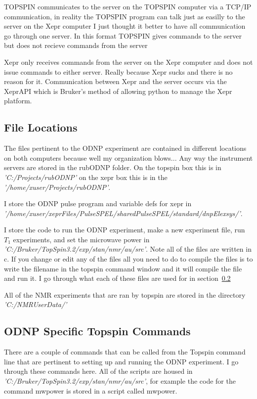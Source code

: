 \documentclass{article}
\newcommand{\fc}[1]{{\color{blue}\textit{'{#1}'}}}
\begin{document}
TOPSPIN communicates to the server on the TOPSPIN computer via a TCP/IP communication, in reality the TOPSPIN program can talk just as easilly to the server on the Xepr computer I just thought it better to have all communication go through one server. In this format TOPSPIN gives commands to the server but does not recieve commands from the server

Xepr only receives commands from the server on the Xepr computer and does not issue commands to either server. Really because Xepr sucks and there is no reason for it. Communication between Xepr and the server occurs via the XeprAPI which is Bruker's method of allowing python to manage the Xepr platform.


\subsection{File Locations}
\label{sec:fileLocs}
The files pertinent to the ODNP experiment are contained in different locations on both computers because well my organization blows... Any way the instrument servers are stored in the rubODNP folder. On the topspin box this is in \fc{C:/Projects/rubODNP} on the xepr box this is in the \fc{/home/xuser/Projects/rubODNP}.

I store the ODNP pulse program and variable defs for xepr in \\ \fc{/home/xuser/xeprFiles/PulseSPEL/sharedPulseSPEL/standard/dnpElexsys/}.

I store the code to run the ODNP experiment, make a new experiment file, run $T_1$ experiments, and set the microwave power in \\ \fc{C:/Bruker/TopSpin3.2/exp/stan/nmr/au/src}. Note all of the files are written in c. If you change or edit any of the files all you need to do to compile the files is to write the filename in the topspin command window and it will compile the file and run it. I go through what each of these files are used for in section~\ref{sec:odnpCommands}

All of the NMR experiments that are ran by topspin are stored in the directory \fc{C:/NMRUserData/}



\subsection{ODNP Specific Topspin Commands}
\label{sec:odnpCommands}

There are a couple of commands that can be called from the Topspin command line that are pertinent to setting up and running the ODNP experiment. I go through these commands here. All of the scripts are housed in \fc{C:/Bruker/TopSpin3.2/exp/stan/nmr/au/src}, for example the code for the command mwpower is stored in a script called mwpower.
\end{document}
